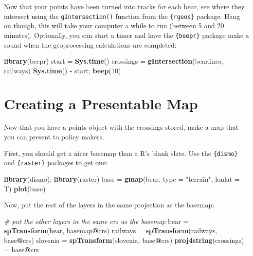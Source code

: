 \documentclass[]{book}
\newenvironment{Shaded}{\begin{snugshade}}{\end{snugshade}}
\newcommand{\KeywordTok}[1]{\textcolor[rgb]{0.13,0.29,0.53}{\textbf{#1}}}
\newcommand{\DataTypeTok}[1]{\textcolor[rgb]{0.13,0.29,0.53}{#1}}
\newcommand{\DecValTok}[1]{\textcolor[rgb]{0.00,0.00,0.81}{#1}}
\newcommand{\StringTok}[1]{\textcolor[rgb]{0.31,0.60,0.02}{#1}}
\newcommand{\CommentTok}[1]{\textcolor[rgb]{0.56,0.35,0.01}{\textit{#1}}}
\newcommand{\OperatorTok}[1]{\textcolor[rgb]{0.81,0.36,0.00}{\textbf{#1}}}
\newcommand{\NormalTok}[1]{#1}
\theoremstyle{definition}
\theoremstyle{definition}
\theoremstyle{definition}
\theoremstyle{remark}
\begin{document}
Now that your points have been turned into tracks for each bear, see
where they intersect using the \texttt{gIntersection()} function from
the \texttt{\{rgeos\}} package. Hang on though, this will take your
computer a while to run (between 5 and 20 minutes). Optionally, you can
start a timer and have the \texttt{\{beepr\}} package \citep{R-beepr}
make a sound when the geoprocessing calculations are completed:

\begin{Shaded}
\begin{Highlighting}[]
\KeywordTok{library}\NormalTok{(beepr)}
\NormalTok{start =}\StringTok{ }\KeywordTok{Sys.time}\NormalTok{()}
\NormalTok{crossings =}\StringTok{ }\KeywordTok{gIntersection}\NormalTok{(bearlines, railways) }
\KeywordTok{Sys.time}\NormalTok{() }\OperatorTok{-}\StringTok{ }\NormalTok{start; }\KeywordTok{beep}\NormalTok{(}\DecValTok{10}\NormalTok{)}
\end{Highlighting}
\end{Shaded}

\section{Creating a Presentable Map}\label{base-maps}

Now that you have a points object with the crossings stored, make a map
that you can present to policy makers.

First, you should get a nicer basemap than a R's blank slate. Use the
\texttt{\{dismo\}} \citep{R-dismo} and \texttt{\{raster\}}
\citep{R-raster} packages to get one:

\begin{Shaded}
\begin{Highlighting}[]
\KeywordTok{library}\NormalTok{(dismo); }\KeywordTok{library}\NormalTok{(raster)}
\NormalTok{base =}\StringTok{ }\KeywordTok{gmap}\NormalTok{(bear, }\DataTypeTok{type =} \StringTok{"terrain"}\NormalTok{, }\DataTypeTok{lonlat =}\NormalTok{ T)}
\KeywordTok{plot}\NormalTok{(base)}
\end{Highlighting}
\end{Shaded}

Now, put the rest of the layers in the same projection as the basemap:

\begin{Shaded}
\begin{Highlighting}[]
\CommentTok{# put the other layers in the same crs as the basemap}
\NormalTok{bear =}\StringTok{ }\KeywordTok{spTransform}\NormalTok{(bear, basemap}\OperatorTok{@}\NormalTok{crs)}
\NormalTok{railways =}\StringTok{ }\KeywordTok{spTransform}\NormalTok{(railways, base}\OperatorTok{@}\NormalTok{crs)}
\NormalTok{slovenia =}\StringTok{ }\KeywordTok{spTransform}\NormalTok{(slovenia, base}\OperatorTok{@}\NormalTok{crs)}
\KeywordTok{proj4string}\NormalTok{(crossings) =}\StringTok{ }\NormalTok{base}\OperatorTok{@}\NormalTok{crs}
\end{Highlighting}
\end{Shaded}
\end{document}
